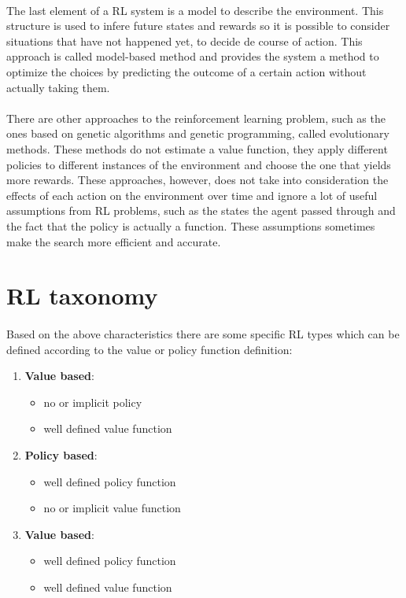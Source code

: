 \documentclass{article}
\begin{document}
\paragraph{}
The last element of a RL system is a model to describe the environment. This structure is used to infere future states and rewards so it is possible to consider situations that have not happened yet, to decide de course of action. This approach is called model-based method and provides the system a method to optimize the choices by predicting the outcome of a certain action without actually taking them. 
\paragraph{}
There are other approaches to the reinforcement learning problem, such as the ones based on genetic algorithms and genetic programming, called evolutionary methods. These methods do not estimate a value function, they apply different policies to different instances of the environment and choose the one that yields more rewards. These approaches, however, does not take into consideration the effects of each action on the environment over time and ignore a lot of useful assumptions from RL problems, such as the states the agent passed through and the fact that the policy is actually a function. These assumptions sometimes make the search more efficient and accurate.

\section{RL taxonomy}
\paragraph{}
Based on the above characteristics there are some specific RL types which can be defined according to the value or policy function definition:
\begin{enumerate}
    \item \textbf{Value based}:
    \begin{itemize}
        \item no or implicit policy
        \item well defined value function
    \end{itemize}
    \item \textbf{Policy based}:
    \begin{itemize}
        \item well defined policy function
        \item no or implicit value function
    \end{itemize}
    \item \textbf{Value based}:
    \begin{itemize}
        \item well defined policy function
        \item well defined value function
    \end{itemize}
\end{enumerate}
\end{document}
